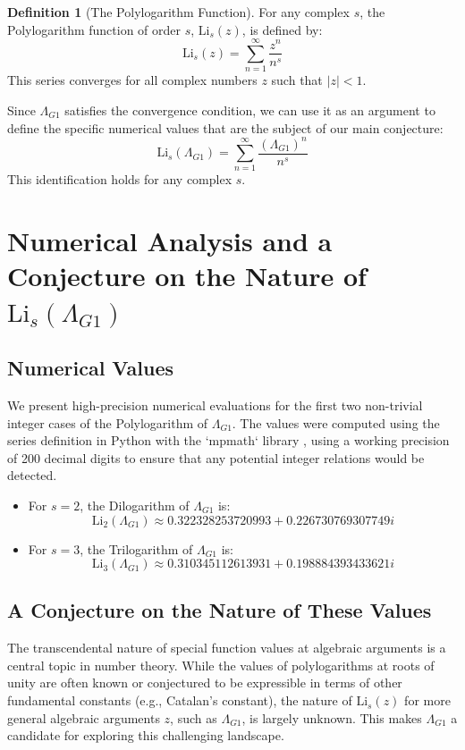 \documentclass{amsart}
\theoremstyle{plain}
\theoremstyle{definition}
\newtheorem{definition}[theorem]{Definition}
\theoremstyle{remark}
\newcommand{\LambdaG}{\Lambda_{G1}}
\begin{document}
\begin{definition}[The Polylogarithm Function]
For any complex $s$, the Polylogarithm function of order $s$, $\mathrm{Li}_s(z)$, is defined by:
$$ \mathrm{Li}_s(z) = \sum_{n=1}^{\infty} \frac{z^n}{n^s} $$
This series converges for all complex numbers $z$ such that $|z|<1$.
\end{definition}

Since $\LambdaG$ satisfies the convergence condition, we can use it as an argument to define the specific numerical values that are the subject of our main conjecture:
$$ \mathrm{Li}_s(\LambdaG) = \sum_{n=1}^{\infty} \frac{(\LambdaG)^{n}}{n^s} $$
This identification holds for any complex $s$.

\section{Numerical Analysis and a Conjecture on the Nature of \texorpdfstring{$\mathrm{Li}_s(\LambdaG)$}{Li\_s(Lambda\_G1)}}

\subsection{Numerical Values}
We present high-precision numerical evaluations for the first two non-trivial integer cases of the Polylogarithm of $\LambdaG$. The values were computed using the series definition in Python with the `mpmath` library \cite{mpmath}, using a working precision of 200 decimal digits to ensure that any potential integer relations would be detected.
\begin{itemize}
    \item For $s=2$, the Dilogarithm of $\LambdaG$ is:
    $$ \mathrm{Li}_2(\LambdaG) \approx 0.322328253720993 + 0.226730769307749i $$
    \item For $s=3$, the Trilogarithm of $\LambdaG$ is:
    $$ \mathrm{Li}_3(\LambdaG) \approx 0.310345112613931 + 0.198884393433621i $$
\end{itemize}

\subsection{A Conjecture on the Nature of These Values}
The transcendental nature of special function values at algebraic arguments is a central topic in number theory. While the values of polylogarithms at roots of unity are often known or conjectured to be expressible in terms of other fundamental constants (e.g., Catalan's constant), the nature of $\mathrm{Li}_s(z)$ for more general algebraic arguments $z$, such as $\LambdaG$, is largely unknown. This makes $\LambdaG$ a candidate for exploring this challenging landscape.
\end{document}
